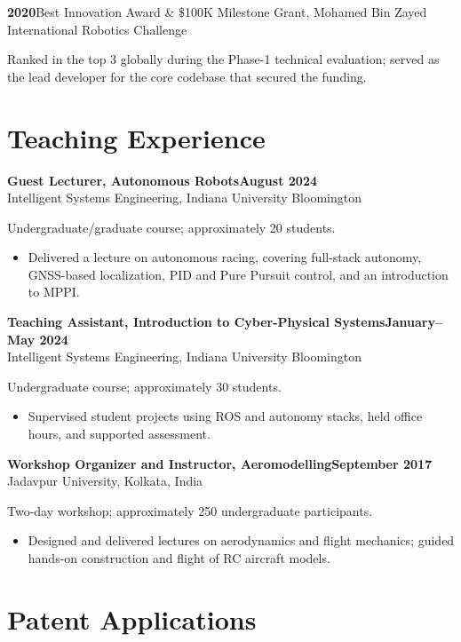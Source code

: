 \documentclass[11pt,letterpaper]{article}
\newcommand{\entry}[3]{
    \Needspace{4\baselineskip}
    \textbf{#1}\hfill\textbf{#2}\\
    #3\par
}
\newcommand{\award}[2]{
    \textbf{#1}\quad #2\par
}
\begin{document}
\award{2020}
{Best Innovation Award \& \$100K Milestone Grant, Mohamed Bin Zayed International Robotics Challenge}
{Ranked in the top 3 globally during the Phase-1 technical evaluation; served as the lead developer for the core codebase that secured the funding.}

\section{Teaching Experience}

\entry{Guest Lecturer, Autonomous Robots}{August 2024}
{Intelligent Systems Engineering, Indiana University Bloomington}

Undergraduate/graduate course; approximately 20 students.

\begin{itemize}
    \item Delivered a lecture on autonomous racing, covering
    full-stack autonomy, GNSS-based localization, PID and
    Pure Pursuit control, and an introduction to MPPI.
\end{itemize}

\newpage


\entry{Teaching Assistant, Introduction to Cyber-Physical Systems}
{January--May 2024}
{Intelligent Systems Engineering, Indiana University Bloomington}

Undergraduate course; approximately 30 students.

\begin{itemize}
    \item Supervised student projects using ROS and autonomy
    stacks, held office hours, and supported assessment.
\end{itemize}

\entry{Workshop Organizer and Instructor, Aeromodelling}
{September 2017}
{Jadavpur University, Kolkata, India}

Two-day workshop; approximately 250 undergraduate participants.

\begin{itemize}
    \item Designed and delivered lectures on aerodynamics
    and flight mechanics; guided hands-on construction
    and flight of RC aircraft models.
\end{itemize}

\section{Patent Applications}
\end{document}
